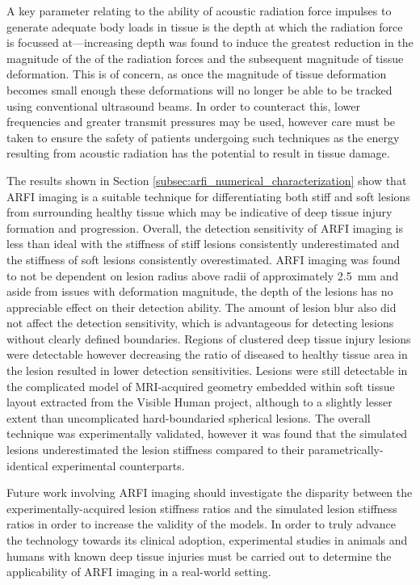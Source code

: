 		A key parameter relating to the ability of acoustic radiation force impulses to generate adequate body loads in tissue is the depth at which the radiation force is focussed at---increasing depth was found to induce the greatest reduction in the magnitude of the of the radiation forces and the subsequent magnitude of tissue deformation. This is of concern, as once the magnitude of tissue deformation becomes small enough these deformations will no longer be able to be tracked using conventional ultrasound beams. In order to counteract this, lower frequencies and greater transmit pressures may be used, however care must be taken to ensure the safety of patients undergoing such techniques as the energy resulting from acoustic radiation has the potential to result in tissue damage.

		The results shown in Section \ref{subsec:arfi_numerical_characterization} show that ARFI imaging is a suitable technique for differentiating both stiff and soft lesions from surrounding healthy tissue which may be indicative of deep tissue injury formation and progression. Overall, the detection sensitivity of ARFI imaging is less than ideal with the stiffness of stiff lesions consistently underestimated and the stiffness of soft lesions consistently overestimated. ARFI imaging was found to not be dependent on lesion radius above radii of approximately \SI{2.5}{\mm} and aside from issues with deformation magnitude, the depth of the lesions has no appreciable effect on their detection ability. The amount of lesion blur also did not affect the detection sensitivity, which is advantageous for detecting lesions without clearly defined boundaries. Regions of clustered deep tissue injury lesions were detectable however decreasing the ratio of diseased to healthy tissue area in the lesion resulted in lower detection sensitivities. Lesions were still detectable in the complicated model of MRI-acquired geometry embedded within soft tissue layout extracted from the Visible Human project, although to a slightly lesser extent than uncomplicated hard-boundaried spherical lesions. The overall technique was experimentally validated, however it was found that the simulated lesions underestimated the lesion stiffness compared to their parametrically-identical experimental counterparts.

		Future work involving ARFI imaging should investigate the disparity between the experimentally-acquired lesion stiffness ratios and the simulated lesion stiffness ratios in order to increase the validity of the models. In order to truly advance the technology towards its clinical adoption, experimental studies in animals and humans with known deep tissue injuries must be carried out to determine the applicability of ARFI imaging in a real-world setting.

